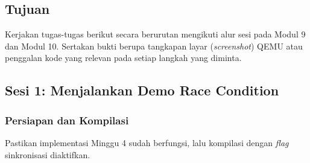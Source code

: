 \subsection{Tujuan}

Kerjakan tugas-tugas berikut secara berurutan mengikuti alur sesi pada Modul 9 dan Modul 10. Sertakan bukti berupa tangkapan layar (\textit{screenshot}) QEMU atau penggalan kode yang relevan pada setiap langkah yang diminta.

\subsection{Sesi 1: Menjalankan Demo Race Condition}

\subsubsection{Persiapan dan Kompilasi}

Pastikan implementasi Minggu 4 sudah berfungsi, lalu kompilasi dengan \textit{flag} sinkronisasi diaktifkan.

